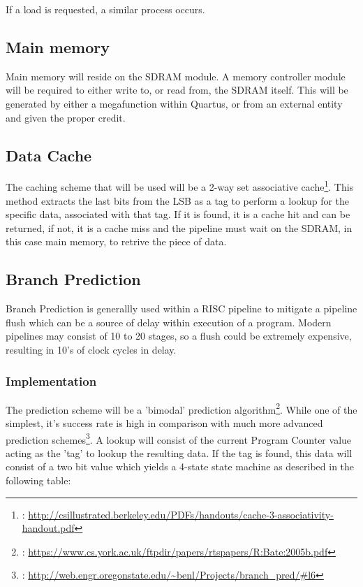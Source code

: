 \documentclass[11pt]{article}
\begin{document}
If a load is requested, a similar process occurs.  

\subsection{Main memory}
\label{sec-3-2}
Main memory will reside on the SDRAM module. A memory controller module will be required to either write to, or read from, the SDRAM itself. This will be generated by either a megafunction within Quartus, or from an external entity and given the proper credit.

\subsection{Data Cache}
\label{sec-3-3}
The caching scheme that will be used will be a 2-way set associative cache\footnote{: \url{http://csillustrated.berkeley.edu/PDFs/handouts/cache-3-associativity-handout.pdf}}. This method extracts the last bits from the LSB as a tag to perform a lookup for the specific data, associated with that tag. If it is found, it is a cache hit and can be returned, if not, it is a cache miss and the pipeline must wait on the SDRAM, in this case main memory, to retrive the piece of data.

\subsection{Branch Prediction}
\label{sec-3-4}
\label{SEC:BranchPrediction}
Branch Prediction is generallly used within a RISC pipeline to mitigate a pipeline flush which can be a source of delay within execution of a program. Modern pipelines may consist of 10 to 20 stages, so a flush could be extremely expensive, resulting in 10's of clock cycles in delay.

\subsubsection{Implementation}
\label{sec-3-4-1}
The prediction scheme will be a 'bimodal' prediction algorithm\footnote{: \url{https://www.cs.york.ac.uk/ftpdir/papers/rtspapers/R:Bate:2005b.pdf}}. While one of the simplest, it's success rate is high in comparison with much more advanced prediction schemes\footnote{: \url{http://web.engr.oregonstate.edu/~benl/Projects/branch_pred/#l6}}. A lookup will consist of the current Program Counter value acting as the 'tag' to lookup the resulting data. If the tag is found, this data will consist of a two bit value which yields a 4-state state machine as described in the following table:
\end{document}

